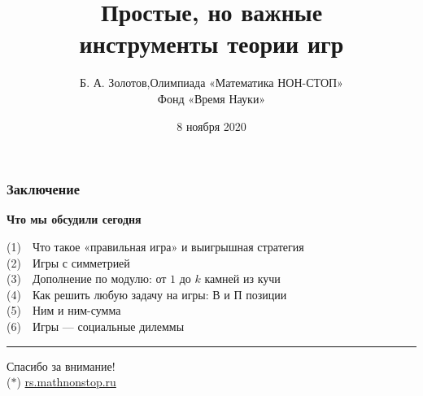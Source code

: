 \documentclass[aspectratio=1610,12pt,notheorems]{beamer}
\title[Introduction to Game Theory]
    {\bfseries Простые, но важные \\ инструменты теории игр}
\author[\ ]
	{Б. А. Золотов,\quad Олимпиада «Математика НОН-СТОП»\\ \vspace{0.3cm}
		{\small Фонд «Время Науки»}}
\institute[\ ]{\ }
\date{8 ноября 2020}
\begin{document}
\frame{\titlepage}









\def\fitem#1#2{\textcolor{hard}{\small (#1)}~~#2 \medskip \\}

\begin{frame} \frametitle{Заключение}

\textcolor{hard}{\bf Что мы обсудили сегодня}

\fitem{1}{Что такое «правильная игра» и выигрышная стратегия}
\fitem{2}{Игры с симметрией}
\fitem{3}{Дополнение по модулю: от $1$ до $k$ камней из кучи}
\fitem{4}{Как решить любую задачу на игры: В и П позиции}
\fitem{5}{Ним и ним-сумма}
\fitem{6}{Игры — социальные дилеммы \vspace{6mm}}

\hrule
\begin{center}
	{\LARGE Спасибо за внимание!} \smallskip \\
	{\footnotesize \textcolor{hard}{($*$)\quad}
		\url{rs.mathnonstop.ru}
		\phantom{($*$)\quad}}
\end{center} \vspace{2.4mm}
\end{frame}
\end{document}
